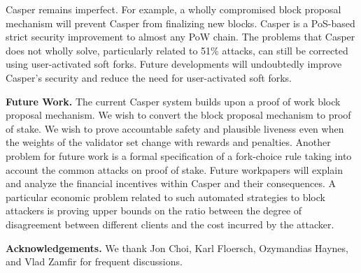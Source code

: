 \documentclass[12pt]{article}
\begin{document}
Casper remains imperfect.  For example, a wholly compromised block proposal mechanism will prevent Casper from finalizing new blocks.  Casper is a PoS-based strict security improvement to almost any PoW chain.  The problems that Casper does not wholly solve, particularly related to 51\% attacks, can still be corrected using user-activated soft forks.  Future developments will undoubtedly improve Casper's security and  reduce the need for user-activated soft forks.





\textbf{Future Work.} The current Casper system builds upon a proof of work block proposal mechanism.  We wish to convert the block proposal mechanism to proof of stake.  We wish to prove accountable safety and plausible liveness even when the weights of the validator set change with rewards and penalties.  Another problem for future work is a formal specification of a fork-choice rule taking into account the common attacks on proof of stake.  Future workpapers will explain and analyze the financial incentives within Casper and their consequences.  A particular economic problem related to such automated strategies to block attackers is proving upper bounds on the ratio between the degree of disagreement between different clients and the cost incurred by the attacker. 



\textbf{Acknowledgements.} We thank Jon Choi, Karl Floersch, Ozymandias Haynes, and Vlad Zamfir for frequent discussions.



%
%

%

\end{document}
